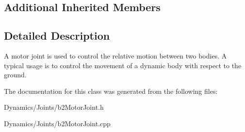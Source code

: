 \subsection*{Additional Inherited Members}


\subsection{Detailed Description}
A motor joint is used to control the relative motion between two bodies. A typical usage is to control the movement of a dynamic body with respect to the ground. 

The documentation for this class was generated from the following files\+:\begin{DoxyCompactItemize}
\item 
Dynamics/\+Joints/b2\+Motor\+Joint.\+h\item 
Dynamics/\+Joints/b2\+Motor\+Joint.\+cpp\end{DoxyCompactItemize}
